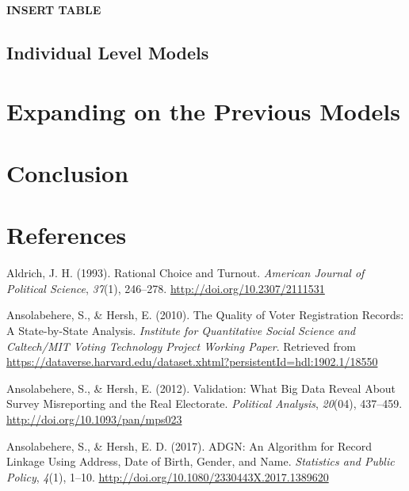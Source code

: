 \documentclass[12pt,twoside]{reedthesis}
\begin{document}
  \textbf{INSERT TABLE}
  
  \section{Individual Level Models}\label{individual-level-models}
  
  \chapter{Expanding on the Previous
  Models}\label{expanding-on-the-previous-models}
  
  \chapter*{Conclusion}\label{conclusion}
  
  \setcounter{chapter}{4} \setcounter{section}{0}
  
  \appendix
  
  \backmatter
  
  \chapter{References}\label{references}
  
  \noindent
  
  \setlength{\parindent}{-0.20in} \setlength{\leftskip}{0.20in}
  \setlength{\parskip}{8pt}
  
  \hypertarget{refs}{}
  \hypertarget{ref-aldrich_rational_1993}{}
  Aldrich, J. H. (1993). Rational Choice and Turnout. \emph{American
  Journal of Political Science}, \emph{37}(1), 246--278.
  \url{http://doi.org/10.2307/2111531}
  
  \hypertarget{ref-ansolabehere_quality_2010}{}
  Ansolabehere, S., \& Hersh, E. (2010). The Quality of Voter Registration
  Records: A State-by-State Analysis. \emph{Institute for Quantitative
  Social Science and Caltech/MIT Voting Technology Project Working Paper}.
  Retrieved from
  \url{https://dataverse.harvard.edu/dataset.xhtml?persistentId=hdl:1902.1/18550}
  
  \hypertarget{ref-ansolabehere_validation:_2012}{}
  Ansolabehere, S., \& Hersh, E. (2012). Validation: What Big Data Reveal
  About Survey Misreporting and the Real Electorate. \emph{Political
  Analysis}, \emph{20}(04), 437--459.
  \url{http://doi.org/10.1093/pan/mps023}
  
  \hypertarget{ref-ansolabehere_adgn:_2017}{}
  Ansolabehere, S., \& Hersh, E. D. (2017). ADGN: An Algorithm for Record
  Linkage Using Address, Date of Birth, Gender, and Name. \emph{Statistics
  and Public Policy}, \emph{4}(1), 1--10.
  \url{http://doi.org/10.1080/2330443X.2017.1389620}
  
\end{document}
